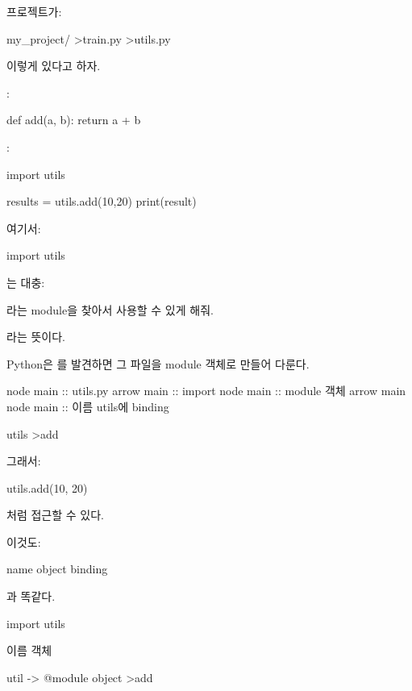 프로젝트가:

\begin{dhkdir}
my_project/
>train.py
>utils.py
\end{dhkdir}

이렇게 있다고 하자.

:

\begin{dhkcode}
def add(a, b):
    return a + b
\end{dhkcode}

:

\begin{dhkcode}
import utils

results = utils.add(10,20)
print(result)
\end{dhkcode}

여기서:

\begin{dhkcode}
import utils
\end{dhkcode}

는 대충:

\begin{dhksmry}[centered]
라는 module을 찾아서 사용할 수 있게 해줘.
\end{dhksmry}

라는 뜻이다.

Python은 를 발견하면 그 파일을 module 객체로 만들어 다룬다.

\begin{dhkbranch}
node main :: utils.py
arrow main :: import
node main :: module 객체
arrow main
node main :: 이름 utils에 binding
\end{dhkbranch}

\begin{dhkdir}
utils
>add
\end{dhkdir}

그래서:

\begin{dhkcode}
utils.add(10, 20)
\end{dhkcode}

처럼 접근할 수 있다.

이것도:

\begin{dhksmry}[centered]
name \ra object binding
\end{dhksmry}

과 똑같다.

\begin{dhkdir}
import utils

이름        객체

util -> @module object
>add
\end{dhkdir}


